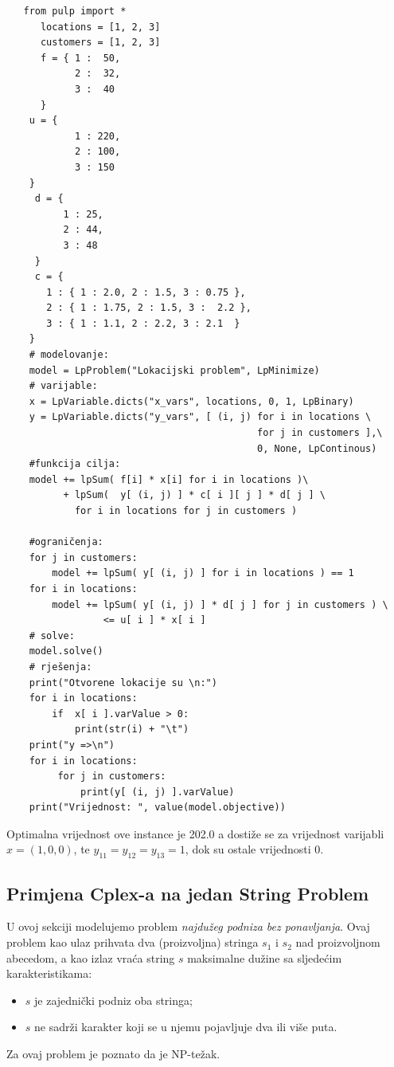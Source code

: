 \documentclass[a4paper, utf8, 11pt, colorlinks]{book}
\begin{document}
 \begin{verbatim}
   from pulp import *
 	  locations = [1, 2, 3]
 	  customers = [1, 2, 3]
 	  f = { 1 :  50,
 	        2 :  32,
 	        3 :  40 
 	  }
    u = {
            1 : 220,
            2 : 100,
            3 : 150
    }
     d = {
          1 : 25,
          2 : 44,
          3 : 48
     }
     c = {
       1 : { 1 : 2.0, 2 : 1.5, 3 : 0.75 },
       2 : { 1 : 1.75, 2 : 1.5, 3 :  2.2 },  
       3 : { 1 : 1.1, 2 : 2.2, 3 : 2.1  }
    }
    # modelovanje:
    model = LpProblem("Lokacijski problem", LpMinimize) 
    # varijable:
    x = LpVariable.dicts("x_vars", locations, 0, 1, LpBinary)
    y = LpVariable.dicts("y_vars", [ (i, j) for i in locations \ 
                                            for j in customers ],\  
                                            0, None, LpContinous)
    #funkcija cilja: 
    model += lpSum( f[i] * x[i] for i in locations )\ 
          + lpSum(  y[ (i, j) ] * c[ i ][ j ] * d[ j ] \ 
            for i in locations for j in customers )
   
    #ograničenja:
    for j in customers:
        model += lpSum( y[ (i, j) ] for i in locations ) == 1
    for i in locations: 
        model += lpSum( y[ (i, j) ] * d[ j ] for j in customers ) \ 
                 <= u[ i ] * x[ i ]
    # solve:
    model.solve()
    # rješenja:
    print("Otvorene lokacije su \n:")
    for i in locations:
        if  x[ i ].varValue > 0:
            print(str(i) + "\t")
    print("y =>\n")
    for i in locations:
         for j in customers:
             print(y[ (i, j) ].varValue)
    print("Vrijednost: ", value(model.objective))    
 \end{verbatim}
 Optimalna vrijednost ove instance je 202.0 a dostiže se za vrijednost varijabli $x = (1, 0, 0)$, te $y_{11}= y_{12}= y_{13} = 1$, dok su ostale vrijednosti 0.
 \subsection{Primjena Cplex-a na jedan String Problem}
 
 U ovoj sekciji modelujemo problem \emph{najdužeg podniza bez ponavljanja}. Ovaj problem kao ulaz prihvata dva (proizvoljna) stringa $s_1$ i $s_2$ nad proizvoljnom abecedom, a kao izlaz vraća string $s$ maksimalne dužine sa sljedećim karakteristikama:  
 \begin{itemize}
 	\item $s$ je zajednički podniz oba stringa; 
 	\item $s$ ne sadrži karakter koji se u njemu pojavljuje dva ili više puta.
 \end{itemize}
Za ovaj problem je poznato da je NP-težak. 
\end{document}
